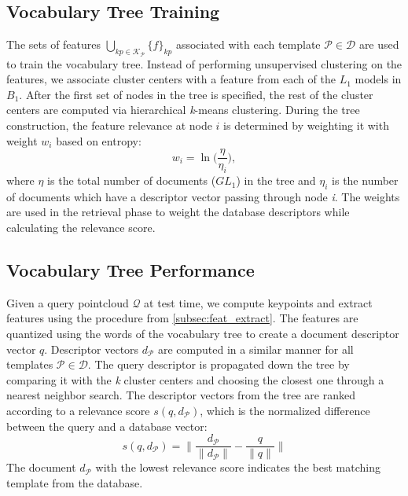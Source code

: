 \subsection{Vocabulary Tree Training}
The sets of features $\bigcup_{kp \in \mathcal{K}_\mathcal{P}} \{f\}_{kp}$ associated with each template $\mathcal{P} \in \mathcal{D}$ are used to train the vocabulary tree. Instead of performing unsupervised clustering on the features, we associate cluster centers with a feature from each of the $L_1$ models in $B_1$. After the first set of nodes in the tree is specified, the rest of the cluster centers are computed via hierarchical \textit{k}-means clustering. During the tree construction, the feature relevance at node $i$ is determined by weighting it with weight $w_i$ based on entropy:
\[
w_i = \ln\biggl(\frac{\eta}{\eta_i}\biggr),
\] 
where \textit{$\eta$} is the total number of documents ($GL_1$) in the tree and \textit{$\eta_i$} is the number of documents which have a descriptor vector passing through node \textit{i}. The weights are used in the retrieval phase to weight the database descriptors while calculating the relevance score.

\subsection{Vocabulary Tree Performance}
Given a query pointcloud $\mathcal{Q}$ at test time, we compute keypoints and extract features using the procedure from \ref{subsec:feat_extract}. The features are quantized using the words of the vocabulary tree to create a document descriptor vector $q$. Descriptor vectors $d_\mathcal{P}$ are computed in a similar manner for all templates $\mathcal{P} \in \mathcal{D}$. The query descriptor is propagated down the tree by comparing it with the \textit{k} cluster centers and choosing the closest one through a nearest neighbor search. The descriptor vectors from the tree are ranked according to a relevance score $s(q,d_\mathcal{P})$, which is the normalized difference between the query and a database vector:  
\[
s(q,d_\mathcal{P}) = \biggl\| \frac{d_\mathcal{P}}{\| d_\mathcal{P} \|} - \frac{q}{\|q\|} \biggr\|
\]
The document $d_\mathcal{P}$ with the lowest relevance score indicates the best matching template from the database.

